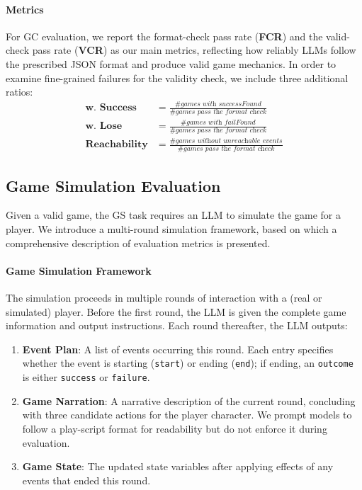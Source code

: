 \paragraph{Metrics}  
For GC evaluation, we report the format-check pass rate (\textbf{FCR}) and the valid-check pass rate (\textbf{VCR}) as our main metrics, reflecting how reliably LLMs follow the prescribed JSON format and produce valid game mechanics. In order to examine fine-grained failures for the validity check, we include three additional ratios:
\begin{equation*}
\begin{aligned}
     \textbf{w. Success} &=\frac{\textit{\# games with successFound}}{\textit{\# games pass the format check}}\\
     \textbf{w. Lose}&=\frac{\textit{\# games with failFound}}{\textit{\# games pass the format check}}\\
     \textbf{Reachability}&=\frac{\textit{\# games without unreachable events}}{\textit{\# games pass the format check}}
\end{aligned}
\end{equation*}

\subsection{Game Simulation Evaluation}

Given a valid game, the GS task requires an LLM to simulate the game for a player. We introduce a multi-round simulation framework, based on which a comprehensive description of evaluation metrics is presented.

\paragraph{Game Simulation Framework}  
The simulation proceeds in multiple rounds of interaction with a (real or simulated) player. Before the first round, the LLM is given the complete game information and output instructions. Each round thereafter, the LLM outputs:
\begin{enumerate}
    \item \textbf{Event Plan}: A list of events occurring this round. Each entry specifies whether the event is starting (\texttt{start}) or ending (\texttt{end}); if ending, an \texttt{outcome} is either \texttt{success} or \texttt{failure}.
    \item \textbf{Game Narration}: A narrative description of the current round, concluding with three candidate actions for the player character. We prompt models to follow a play-script format for readability but do not enforce it during evaluation.
    \item \textbf{Game State}: The updated state variables after applying effects of any events that ended this round.
\end{enumerate}

